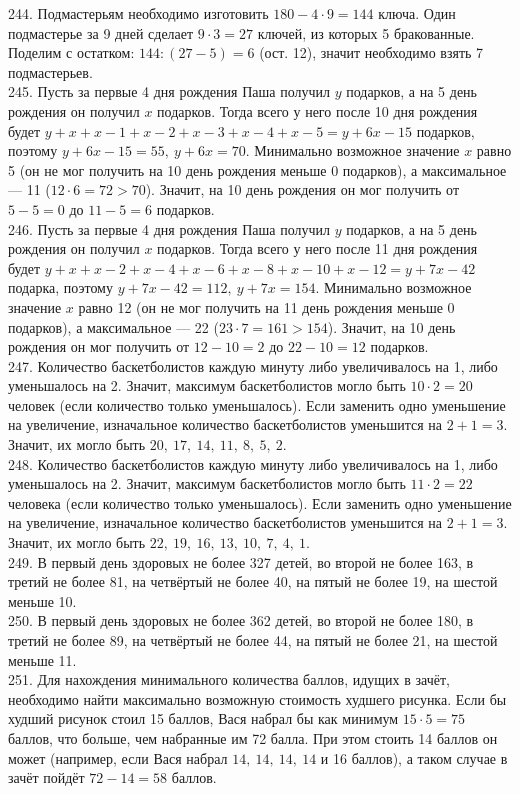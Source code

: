 244. Подмастерьям необходимо изготовить $180-4\cdot9=144$ ключа. Один подмастерье за 9 дней сделает $9\cdot3=27$ ключей, из которых 5 бракованные. Поделим с остатком: $144:(27-5)=6$ (ост. 12), значит необходимо взять 7 подмастерьев.\\
245. Пусть за первые 4 дня рождения Паша получил $y$ подарков, а на 5 день рождения он получил $x$ подарков. Тогда всего у него после 10 дня рождения будет $y+x+x-1+x-2+x-3+x-4+x-5=y+6x-15$ подарков, поэтому $y+6x-15=55,\ y+6x=70.$ Минимально возможное значение $x$ равно 5 (он не мог получить на 10 день рождения меньше 0 подарков), а максимальное --- 11 ($12\cdot6=72>70$). Значит, на 10 день рождения он мог получить от $5-5=0$ до $11-5=6$ подарков.\\
246. Пусть за первые 4 дня рождения Паша получил $y$ подарков, а на 5 день рождения он получил $x$ подарков. Тогда всего у него после 11 дня рождения будет $y+x+x-2+x-4+x-6+x-8+x-10+x-12=y+7x-42$ подарка, поэтому $y+7x-42=112,\ y+7x=154.$ Минимально возможное значение $x$ равно 12 (он не мог получить на 11 день рождения меньше 0 подарков), а максимальное --- 22 ($23\cdot7=161>154$). Значит, на 10 день рождения он мог получить от $12-10=2$ до $22-10=12$ подарков.\\
247. Количество баскетболистов каждую минуту либо увеличивалось на 1, либо уменьшалось на 2. Значит, максимум баскетболистов могло быть $10\cdot2=20$ человек (если количество только уменьшалось). Если заменить одно уменьшение на увеличение, изначальное количество баскетболистов уменьшится на $2+1=3.$ Значит, их могло быть $20,\ 17,\ 14,\ 11,\ 8,\ 5,\ 2.$\\
248. Количество баскетболистов каждую минуту либо увеличивалось на 1, либо уменьшалось на 2. Значит, максимум баскетболистов могло быть $11\cdot2=22$ человека (если количество только уменьшалось). Если заменить одно уменьшение на увеличение, изначальное количество баскетболистов уменьшится на $2+1=3.$ Значит, их могло быть $22,\ 19,\ 16,\ 13,\ 10,\ 7,\ 4,\ 1.$\\
249. В первый день здоровых не более 327 детей, во второй не более 163, в третий не более 81, на четвёртый не более 40, на пятый не более 19, на шестой меньше 10.\\
250. В первый день здоровых не более 362 детей, во второй не более 180, в третий не более 89, на четвёртый не более 44, на пятый не более 21, на шестой меньше 11.\\
251. Для нахождения минимального количества баллов, идущих в зачёт, необходимо найти максимально возможную стоимость худшего рисунка. Если бы худший рисунок стоил 15 баллов, Вася набрал бы как минимум $15\cdot5=75$ баллов, что больше, чем набранные им 72 балла. При этом стоить 14 баллов он может (например, если Вася набрал $14,\ 14,\ 14,\ 14$ и 16 баллов), а таком случае в зачёт пойдёт $72-14=58$ баллов.\\

